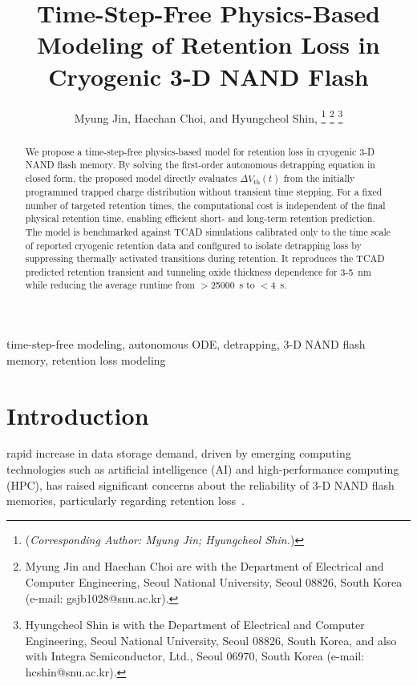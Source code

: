 \documentclass[journal,twoside,web]{ieeecolor}
\begin{document}
\IEEEaftertitletext{\vspace{-1cm}} %
\title{Time-Step-Free Physics-Based Modeling of Retention Loss in Cryogenic 3-D NAND Flash}\author{Myung Jin, Haechan Choi, and Hyungcheol Shin, 
\thanks{(\textit{Corresponding Author: Myung Jin; Hyungcheol Shin.}) }
\thanks{Myung Jin and Haechan Choi are with the Department of Electrical and Computer Engineering, Seoul National University, Seoul 08826, South Korea (e-mail: gsjb1028@snu.ac.kr).}
\thanks{Hyungcheol Shin is with the Department of Electrical and Computer Engineering, Seoul National University, Seoul 08826, South Korea, and also with Integra Semiconductor, Ltd., Seoul 06970, South Korea (e-mail: hcshin@snu.ac.kr).}}

\maketitle
\begin{abstract}
We propose a time-step-free physics-based model for retention loss in cryogenic 3-D NAND flash memory.
By solving the first-order autonomous detrapping equation in closed form, the proposed model directly evaluates $\Delta V_\text{th}(t)$ from the initially programmed trapped charge distribution without transient time stepping.
For a fixed number of targeted retention times, the computational cost is independent of the final physical retention time, enabling efficient short- and long-term retention prediction.
The model is benchmarked against TCAD simulations calibrated {only} to the time scale of reported cryogenic retention data and configured to isolate detrapping loss by suppressing thermally activated transitions during retention.
It reproduces the TCAD predicted retention transient and tunneling oxide thickness dependence for 3-5~nm while reducing the average runtime from $>$25000~s to $<$4~s.
\end{abstract}

\begin{IEEEkeywords}
time-step-free modeling, autonomous ODE, detrapping, 3-D NAND flash memory, retention loss modeling
\end{IEEEkeywords}

\section{Introduction}
\label{sec:introduction}
 rapid increase in data storage demand, driven by emerging computing technologies such as artificial intelligence (AI) and high-performance computing (HPC), has raised significant concerns about the reliability of 3-D NAND flash memories, particularly regarding retention loss~\cite{agoda}.
\end{document}
